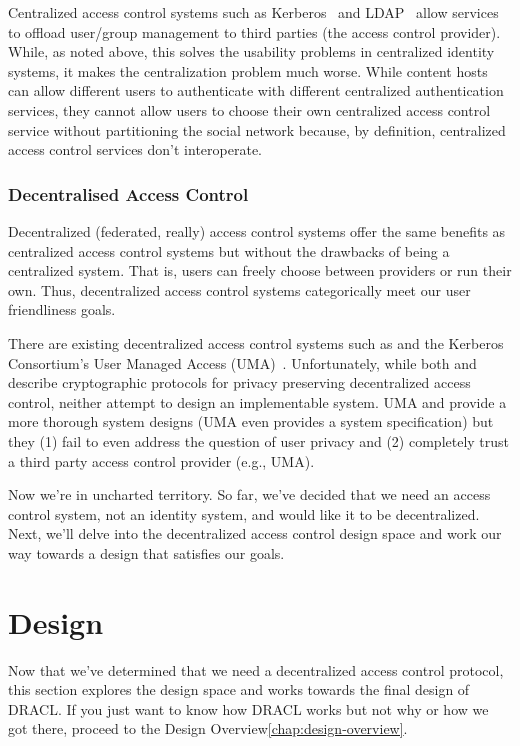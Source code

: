 \documentclass[pdftex,12pt,a4papaer]{report}
\begin{document}
Centralized access control systems such as Kerberos~\cite{kerberos} and
LDAP~\cite{ldap} allow services to offload user/group management to third
parties (the access control provider). While, as noted above, this solves the
usability problems in centralized identity systems, it makes the centralization
problem much worse. While content hosts can allow different users to
authenticate with different centralized authentication services, they cannot
allow users to choose their own centralized access control service without
partitioning the social network because, by definition, centralized access
control services don't interoperate.

\subsubsection{Decentralised Access Control}

Decentralized (federated, really) access control systems offer the same benefits
as centralized access control systems but without the drawbacks of being a
centralized system. That is, users can freely choose between providers or run
their own. Thus, decentralized access control systems categorically meet our
user friendliness goals.

There are existing decentralized access control systems such as \cite{attrib}
\cite{privattrib} \cite{drbac} \cite{socnet} and the Kerberos Consortium's User
Managed Access (UMA)~\cite{uma}. Unfortunately, while both \cite{attrib} and
\cite{privattrib} describe cryptographic protocols for privacy preserving
decentralized access control, neither attempt to design an implementable system.
UMA\cite{uma} \cite{drbac} and \cite{socnet} provide a more thorough system
designs (UMA even provides a system specification) but they (1) fail to even
address the question of user privacy and (2) completely trust a third party
access control provider (e.g., UMA).

Now we're in uncharted territory. So far, we've decided that we need an access
control system, not an identity system, and would like it to be decentralized.
Next, we'll delve into the decentralized access control design space and work
our way towards a design that satisfies our goals.

\section{Design}

Now that we've determined that we need a decentralized access control protocol,
this section explores the design space and works towards the final design of
DRACL. If you just want to know how DRACL works but not why or how we got there,
proceed to the Design Overview\ref{chap:design-overview}.
\end{document}
